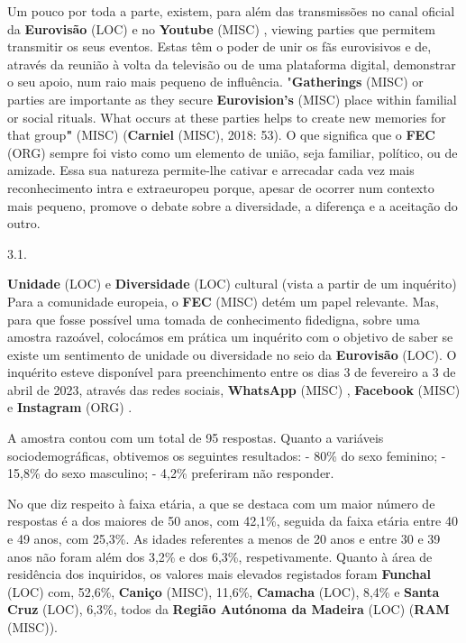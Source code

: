 \documentclass[12pt,a4paper]{article}
\begin{document}
Um pouco por toda a parte, existem, para além das transmissões no canal oficial da  \textbf{Eurovisão} (LOC)  e  no \textbf{Youtube} (MISC) , viewing  parties que  permitem  transmitir  os  seus eventos.  Estas têm o poder de unir os fãs eurovisivos e de, através da reunião à volta da televisão ou de uma plataforma digital, demonstrar o seu apoio, num raio mais pequeno de  influência.  "\textbf{Gatherings} (MISC)  or  parties  are  importante  as  they  secure  \textbf{Eurovision's} (MISC)  place within familial or social rituals. What occurs at these parties helps to create new memories for that group\textbf{"} (MISC) (\textbf{Carniel} (MISC), 2018: 53). O que significa que o \textbf{FEC} (ORG) sempre foi visto como um elemento de união, seja familiar, político, ou de amizade. Essa sua natureza permite-lhe cativar e arrecadar cada vez mais reconhecimento intra e extraeuropeu porque, apesar de ocorrer num contexto mais pequeno, promove o debate sobre a diversidade, a diferença e a aceitação do outro.

3.1.

\textbf{Unidade} (LOC) e \textbf{Diversidade} (LOC) cultural (vista a partir de um inquérito) Para  a  comunidade  europeia,  o  \textbf{FEC} (MISC)  detém  um  papel  relevante.  Mas,  para  que fosse  possível  uma  tomada  de  conhecimento  fidedigna,  sobre  uma  amostra  razoável, colocámos em prática um inquérito com o objetivo de saber se existe um sentimento de unidade  ou  diversidade  no  seio  da  \textbf{Eurovisão} (LOC).  O  inquérito  esteve  disponível  para preenchimento entre os dias 3 de fevereiro a 3 de abril de 2023, através das redes sociais, \textbf{WhatsApp} (MISC) , \textbf{Facebook} (MISC) e \textbf{Instagram} (ORG) .

A  amostra  contou  com  um  total  de  95  respostas.  Quanto  a  variáveis sociodemográficas, obtivemos os seguintes resultados: - 80\% do sexo feminino; - 15,8\% do sexo masculino; - 4,2\% preferiram não responder.

No  que  diz  respeito  à  faixa  etária,  a  que  se  destaca  com  um  maior  número  de respostas é a dos maiores de 50 anos, com 42,1\%, seguida da faixa etária entre 40 e 49 anos, com 25,3\%. As idades referentes a menos de 20 anos e entre 30 e 39 anos não foram além dos 3,2\% e dos 6,3\%, respetivamente. Quanto à área de residência dos inquiridos, os  valores  mais  elevados  registados  foram  \textbf{Funchal} (LOC)  com,  52,6\%,  \textbf{Caniço} (MISC),  11,6\%, \textbf{Camacha} (LOC),  8,4\%  e  \textbf{Santa  Cruz} (LOC),  6,3\%,  todos  da  \textbf{Região  Autónoma  da  Madeira} (LOC)  (\textbf{RAM} (MISC)).
\end{document}
